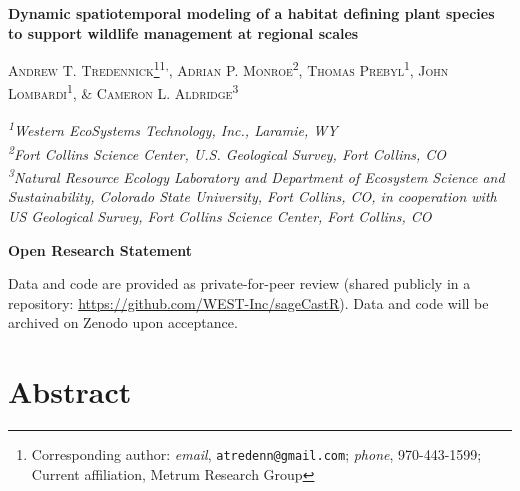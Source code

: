 \documentclass[
  12pt,
]{article}
\author{}
\date{\vspace{-2.5em}}
\begin{document}

\newcommand{\new}{\textcolor{blue}} 
\newcommand{\comm}{\textcolor{ForestGreen}}
\newcommand{\response}{\textcolor{blue}}
\newcommand{\reply}{\textcolor{blue}}
\renewcommand*{\thefootnote}{\fnsymbol{footnote}}

\begin{centering}
\textbf{\Large{Dynamic spatiotemporal modeling of a habitat defining plant species to support wildlife management at regional scales}}

\textsc{\small{Andrew T. Tredennick\footnote{Corresponding author: \textit{email}, \texttt{atredenn@gmail.com}; \textit{phone}, 970-443-1599; Current affiliation, Metrum Research Group}\textsuperscript{1,}, Adrian P. Monroe\textsuperscript{2}, Thomas Prebyl\textsuperscript{1}, John Lombardi\textsuperscript{1}, \& Cameron L. Aldridge\textsuperscript{3}}}

\textit{\small{\textsuperscript{1}Western EcoSystems Technology, Inc., Laramie, WY}} \\
\textit{\small{\textsuperscript{2}Fort Collins Science Center, U.S. Geological Survey, Fort Collins, CO}} \\
\textit{\small{\textsuperscript{3}Natural Resource Ecology Laboratory and Department of Ecosystem Science and Sustainability, Colorado State University, Fort Collins, CO, in cooperation with US Geological Survey, Fort Collins Science Center, Fort Collins, CO}}

\end{centering}

\renewcommand*{\thefootnote}{\arabic{footnote}}
\setcounter{footnote}{0}

\bigskip{}

\noindent{}\textbf{Open Research Statement}

\noindent{}Data and code are provided as private-for-peer review (shared publicly in a repository: \url{https://github.com/WEST-Inc/sageCastR}). Data and code will be archived on Zenodo upon acceptance.

\newpage{}

\hypertarget{abstract}{%
\section{Abstract}\label{abstract}}
\end{document}
